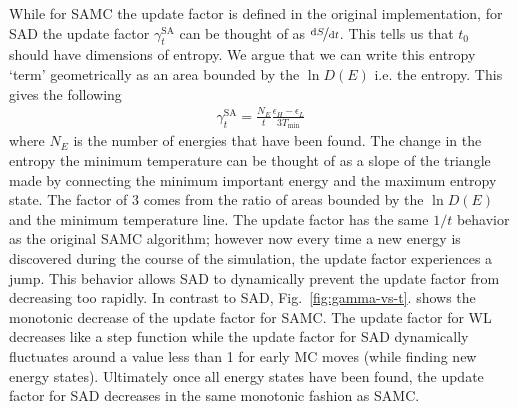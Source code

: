 \documentclass[letterpaper,twocolumn,amsmath,amssymb,pre,aps,10pt]{revtex4-1}
\begin{document}
While for SAMC the update factor is defined in the original
implementation, for SAD the update factor $\gamma_{t}^{\text{SA}}$ can
be thought of as $\nicefrac{\text{d}S}{\text{d}t}$. This tells us that
$t_0$ should have dimensions of entropy.  We argue that we can write
this entropy `term' geometrically as an area bounded by the $\ln{D(E)}$
i.e. the entropy. This gives the following
\begin{align}
\gamma_{t}^{\text{SA}} =
\frac{N_E}{t}\frac{\epsilon_{H}-\epsilon_{L}}{3T_{\text{min}}}
\end{align}
where $N_E$ is the number of energies that have been found. The change
in the entropy the minimum temperature can be thought of as a slope of
the triangle made by connecting the minimum important energy and the
maximum entropy state.  The factor of $3$ comes from the ratio of areas
bounded by the $\ln{D(E)}$ and the minimum temperature line. The update
factor has the same $1/t$ behavior as the original SAMC algorithm;
however now every time a new energy is discovered during the course of
the simulation, the update factor experiences a jump. This behavior
allows SAD to dynamically prevent the update factor from decreasing too
rapidly. In contrast to SAD, Fig.~\ref{fig:gamma-vs-t}. shows the
monotonic decrease of the update factor for SAMC.  The update factor
for WL decreases like a step function while the update factor for SAD
dynamically fluctuates around a value less than 1 for early MC moves
(while finding new energy states).  Ultimately once all energy states
have been found, the update factor for SAD decreases in the same
monotonic fashion as SAMC.
\end{document}
